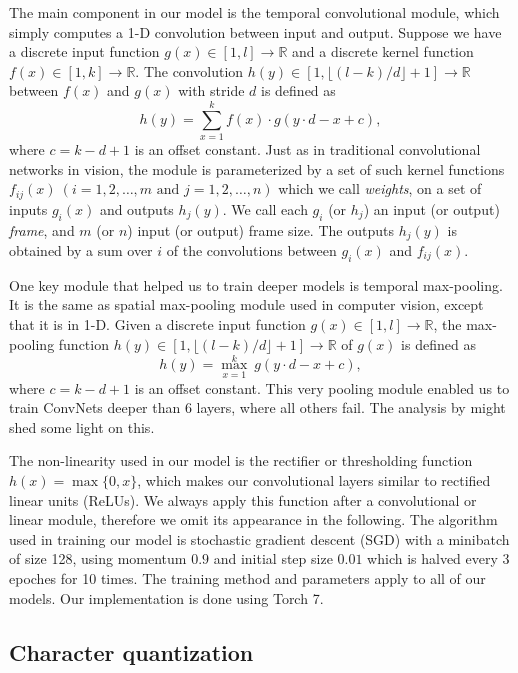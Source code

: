 \documentclass{article}
\begin{document}
\begin{CJK}{UTF8}{gbsn}
The main component in our model is the temporal convolutional module, which simply computes a 1-D convolution between input and output. Suppose we have a discrete input function \(g(x) \in [1,l] \rightarrow \mathbb{R}\) and a discrete kernel function \(f(x) \in [1, k] \rightarrow \mathbb{R}\). The convolution \(h(y) \in [1,\lfloor (l-k)/d \rfloor + 1] \rightarrow \mathbb{R}\)  between \(f(x)\) and \(g(x)\) with stride \(d\) is defined as
\[
h(y) = \sum_{x = 1}^{k} f(x) \cdot g(y \cdot d - x + c),
\]
where \(c = k - d + 1\) is an offset constant. Just as in traditional convolutional networks in vision, the module is parameterized by a set of such kernel functions \(f_{ij} (x) ~ (i = 1, 2, \dots, m \text{ and } j = 1, 2, \dots, n )\) which we call \textit{weights}, on a set of inputs \(g_i(x) \) and outputs \(h_j(y)\). We call each \(g_i\) (or \(h_j\)) an input (or output) \textit{frame}, and \(m\) (or \(n\)) input (or output) frame size. The outputs \(h_j(y)\) is obtained by a sum over \(i\) of the convolutions between \(g_i(x)\) and \(f_{ij}(x)\).

One key module that helped us to train deeper models is temporal max-pooling. It is the same as spatial max-pooling module used in computer vision\cite{BBLP10}, except that it is in 1-D. Given a discrete input function \(g(x) \in [1,l] \rightarrow \mathbb{R}\), the max-pooling function \(h(y) \in [1,\lfloor (l-k)/d \rfloor + 1] \rightarrow \mathbb{R}\) of \(g(x)\) is defined as
\[
h(y) = \max_{x = 1}^{k} ~ g(y \cdot d - x + c),
\]
where \(c = k - d + 1\) is an offset constant. This very pooling module enabled us to train ConvNets deeper than 6 layers, where all others fail. The analysis by \cite{BPL10} might shed some light on this.

The non-linearity used in our model is the rectifier or thresholding function \(h(x) = \max\{0, x\}\), which makes our convolutional layers similar to rectified linear units (ReLUs)\cite{NH10}. We always apply this function after a convolutional or linear module, therefore we omit its appearance in the following. The algorithm used in training our model is stochastic gradient descent (SGD) with a minibatch of size 128, using momentum\cite{P64}\cite{SMDH13} \(0.9\) and initial step size \(0.01\) which is halved every 3 epoches for 10 times. The training method and parameters apply to all of our models. Our implementation is done using Torch 7\cite{CKF11}.

\subsection{Character quantization}


\end{CJK}
\end{document}
